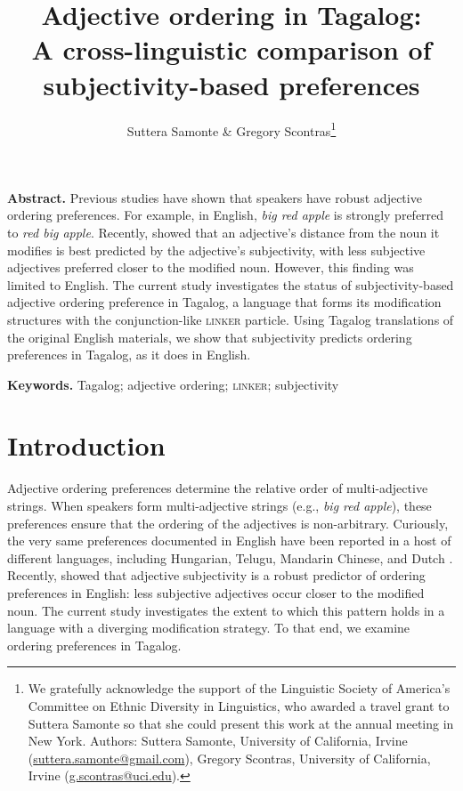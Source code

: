 \documentclass[12pt,letterpaper]{article}
\title{
Adjective ordering in Tagalog:\\
A cross-linguistic comparison of subjectivity-based preferences
}
\author{Suttera Samonte \& Gregory Scontras\footnote{We gratefully acknowledge the support of the Linguistic Society of America's Committee on Ethnic Diversity in Linguistics, who awarded a travel grant to Suttera Samonte so that she could present this work at the annual meeting in New York. %
Authors: Suttera Samonte, University of California, Irvine (\href{mailto:suttera.samonte@gmail.com}{suttera.samonte@gmail.com}),
Gregory Scontras, University of California, Irvine (\href{mailto:g.scontras@uci.edu}{g.scontras@uci.edu}).
}
}
\renewenvironment{abstract}{%
\noindent\begin{minipage}{1\textwidth}
\setlength{\leftskip}{0.4in}
\setlength{\rightskip}{0.4in}
\textbf{Abstract.}}
{\end{minipage}}
\newenvironment{keywords}{%
\vspace{.5em}
\noindent\begin{minipage}{1\textwidth}
\setlength{\leftskip}{0.4in}
\setlength{\rightskip}{0.4in}
\textbf{Keywords.}}
{\end{minipage}}
\begin{document}
\setlength{\Extopsep}{6pt}
\setlength{\Exlabelsep}{9pt}		%


\maketitle

\begin{abstract}
Previous studies have shown that speakers have robust adjective ordering preferences. For example, in English, \emph{big red apple} is strongly preferred to \emph{red big apple}. Recently, \cite{scontrasetal2017adjectives}
showed that an adjective's distance from the noun it modifies is best predicted by the adjective's subjectivity, with less subjective adjectives preferred closer to the modified noun. However, this finding was limited to English. The current study investigates the status of subjectivity-based adjective ordering preference in Tagalog, a language that forms its modification structures with the conjunction-like \textsc{linker} particle. Using Tagalog translations of the original English materials, we show that subjectivity predicts ordering preferences in Tagalog, as it does in English.
\end{abstract}

\begin{keywords}
Tagalog; adjective ordering; \textsc{linker}; subjectivity
\end{keywords}

\section{Introduction}

Adjective ordering preferences determine the relative order of multi-adjective strings. When speakers form multi-adjective strings (e.g., \emph{big red apple}), these preferences ensure that the ordering of the adjectives is non-arbitrary.  Curiously, the very same preferences documented in English have been reported in a host of different languages, including Hungarian, Telugu, Mandarin Chinese, and Dutch \citep[e.g.,][]{Martin1969competence,hetzron1978,dixon1982,sproatshih1991}.  
Recently, \cite{scontrasetal2017adjectives} showed that adjective subjectivity is a robust predictor of ordering preferences in English: less subjective adjectives occur closer to the modified noun. The current study investigates the extent to which this pattern holds in a language with a diverging modification strategy. To that end, we examine ordering preferences in Tagalog. 
\end{document}
